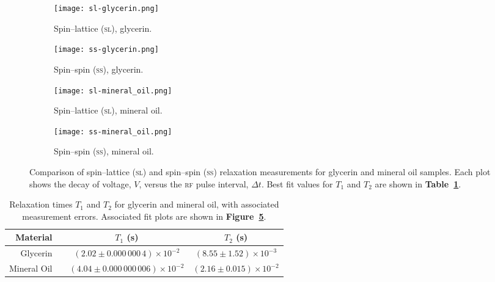 \documentclass[12pt]{report}
\begin{document}
\begin{figure}[tbh]
    \centering
    \begin{subfigure}{0.45\textwidth}
        \centering
        \texttt{[image: sl-glycerin.png]}
        \caption{Spin–lattice (\textsc{sl}), glycerin.}
        \label{fig:sl-glycerin}
    \end{subfigure}
    \hspace{0.02\textwidth} %
    \begin{subfigure}{0.45\textwidth}
        \centering
        \texttt{[image: ss-glycerin.png]}
        \caption{Spin–spin (\textsc{ss}), glycerin.}
        \label{fig:ss-glycerin}
    \end{subfigure}
    
    \vspace{\baselineskip} %
    
    \begin{subfigure}{0.45\textwidth}
        \centering
        \texttt{[image: sl-mineral\_oil.png]}
        \caption{Spin–lattice (\textsc{sl}), mineral oil.}
        \label{fig:sl-mineral-oil}
    \end{subfigure}
    \hspace{0.02\textwidth} %
    \begin{subfigure}{0.45\textwidth}
        \centering
        \texttt{[image: ss-mineral\_oil.png]}
        \caption{Spin–spin (\textsc{ss}), mineral oil.}
        \label{fig:ss-mineral-oil}
    \end{subfigure}
    
    \caption{Comparison of spin–lattice (\textsc{sl}) and spin–spin (\textsc{ss}) relaxation measurements for glycerin and mineral oil samples. Each plot shows the decay of voltage, $V$, versus the \textsc{rf} pulse interval, $\Delta t$. Best fit values for $T_1$ and $T_2$ are shown in \textbf{Table~\ref{tab:relaxation-times}}.}
    \label{fig:fit-plots}
\end{figure}

\begin{table}[tbh]
    \centering
    \begin{tabular}{rccc}
         \textbf{Material}   && $T_1$ (s) & $T_2$ (s) \\ \hline
        Glycerin    && $(2.02 \pm 0.000\,000\,4) \times 10^{-2}$ & $(8.55 \pm 1.52) \times 10^{-3}$ \\
        Mineral Oil && $(4.04 \pm 0.000\,000\,006) \times 10^{-2}$ & $(2.16 \pm 0.015) \times 10^{-2}$ \\
    \end{tabular}
    \caption{Relaxation times $T_1$ and $T_2$ for glycerin and mineral oil, with associated measurement errors. Associated fit plots are shown in \textbf{Figure~\ref{fig:fit-plots}}.}
    \label{tab:relaxation-times}
\end{table}
\end{document}

